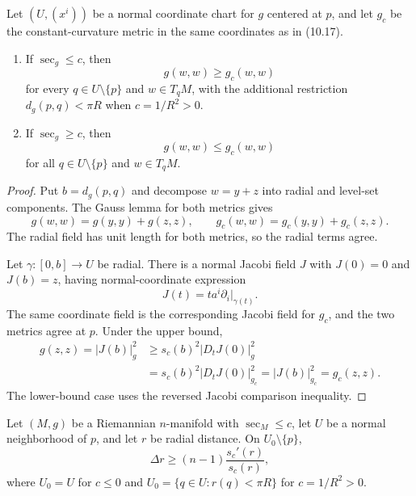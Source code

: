 \begin{theorem}
\label{thm:metric-comparison}

Let $(U,(x^i))$ be a normal coordinate chart for $g$ centered at $p$, and let
$g_c$ be the constant-curvature metric in the same coordinates as in (10.17).
\begin{enumerate}
\item[(a)] If $\sec_g\leq c$, then
\[
g(w,w)\geq g_c(w,w)
\]
for every $q\in U\setminus\{p\}$ and $w\in T_qM$, with the additional
restriction $d_g(p,q)<\pi R$ when $c=1/R^2>0$.
\item[(b)] If $\sec_g\geq c$, then
\[
g(w,w)\leq g_c(w,w)
\]
for all $q\in U\setminus\{p\}$ and $w\in T_qM$.
\end{enumerate}
\end{theorem}

\begin{proof}
\sketch Put $b=d_g(p,q)$ and decompose
$w=y+z$ into radial and level-set components. The Gauss lemma for both metrics
gives
\[
g(w,w)=g(y,y)+g(z,z),
\qquad
g_c(w,w)=g_c(y,y)+g_c(z,z).
\]
The radial field has unit length for both metrics, so the radial terms agree.

Let $\gamma\colon[0,b]\to U$ be radial. There is a normal Jacobi field $J$
with $J(0)=0$ and $J(b)=z$, having normal-coordinate expression
\[
J(t)=t a^i\partial_i|_{\gamma(t)}.
\]
The same coordinate field is the corresponding Jacobi field for $g_c$, and
the two metrics agree at $p$. Under the upper bound,
\begin{align*}
g(z,z)=|J(b)|_g^2
&\geq s_c(b)^2|D_tJ(0)|_g^2\\
&=s_c(b)^2|D_tJ(0)|_{g_c}^2
=|J(b)|_{g_c}^2=g_c(z,z).
\end{align*}
The lower-bound case uses the reversed Jacobi comparison inequality.
\end{proof}

\begin{theorem}
\label{thm:laplacian-comparison-1}

Let $(M,g)$ be a Riemannian $n$-manifold with $\sec_M\leq c$, let $U$ be a
normal neighborhood of $p$, and let $r$ be radial distance. On
$U_0\setminus\{p\}$,
\[
\Delta r\geq(n-1)\frac{s_c'(r)}{s_c(r)},
\]
where $U_0=U$ for $c\leq0$ and
$U_0=\{q\in U:r(q)<\pi R\}$ for $c=1/R^2>0$.
\end{theorem}

